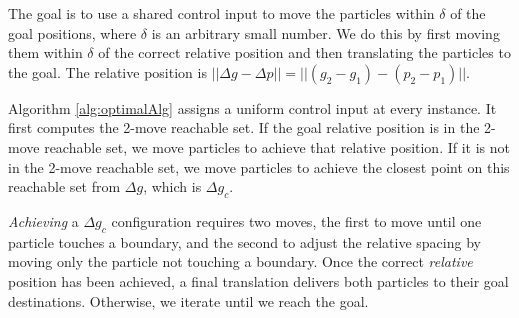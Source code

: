 The goal is to use a shared control input to move the particles within $\delta$ of the goal positions, where $\delta$ is an arbitrary small number. We do this by first moving them within $\delta$ of the correct relative position and then translating the particles to the goal. The relative position is $||\Delta g - \Delta p || = ||(g_2-g_1)- (p_2-p_1)||$.  




 Algorithm \ref{alg:optimalAlg} assigns a uniform control input at every instance.
 It first computes the 2-move reachable set. If the goal relative position is in the 2-move reachable set, we move particles to achieve that relative position. If it is not in the 2-move reachable set, we move particles to achieve the closest point on this reachable set from $\Delta g$, which is $\Delta g_c$. 

 \emph{Achieving} a $\Delta g_c$ configuration requires two moves, the first to move until one particle touches a boundary, and the second to adjust the relative spacing by moving only the particle not touching a boundary.
 Once the correct \emph{relative} position has been achieved, a final translation delivers both particles to their goal destinations. %
 Otherwise, we iterate until we reach the goal. 




 




